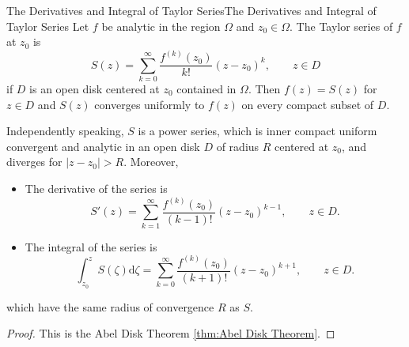 \documentclass[../main.tex]{subfiles}
\begin{document}
\begin{proposition}{The Derivatives and Integral of Taylor Series}{The Derivatives and Integral of Taylor Series}
	Let $f$ be analytic in the region $\Omega$ and $z_0\in \Omega$. The Taylor series of $f$ at $z_0$ is
	\begin{equation*}
		S(z) = \sum_{k=0}^{\infty} \frac{f^{(k)}(z_0)}{k!} (z-z_0)^k, \qquad z\in D
	\end{equation*}
	if $D$ is an open disk centered at $z_0$ contained in $\Omega$. Then $f(z)=S(z)$ for $z\in D$ and $S(z)$ converges uniformly to $f(z)$ on every compact subset of $D$.

	Independently speaking, $S$ is a power series, which is inner compact uniform convergent and analytic in an open disk $D$ of radius $R$ centered at $z_0$, and diverges for $\left|z-z_0\right|>R$. Moreover,
	\begin{itemize}
		\item The derivative of the series is
			\begin{equation*}
				S'(z) = \sum_{k=1}^{\infty} \frac{f^{(k)}(z_0)}{(k-1)!} (z-z_0)^{k-1}, \qquad z\in D.
			\end{equation*}
		\item The integral of the series is
			\begin{equation*}
				\int_{z_0}^{z} S(\zeta) \mathrm{d} \zeta = \sum_{k=0}^{\infty} \frac{f^{(k)}(z_0)}{(k+1)!} (z-z_0)^{k+1}, \qquad z\in D.
			\end{equation*}
	\end{itemize}
	which have the same radius of convergence $R$ as $S$.
\end{proposition}
\begin{proof}
	This is the Abel Disk Theorem \ref{thm:Abel Disk Theorem}.
\end{proof}
\end{document}
